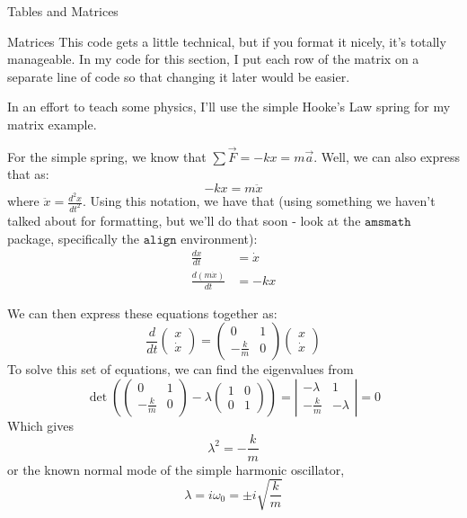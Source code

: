 \documentclass[onecolumn]{article}
\begin{document}
\begin{section}{Tables and Matrices}
	\begin{subsection}{Matrices}
		This code gets a little technical, but if you format it nicely, it's totally manageable. In my code for this section, I put each row of the matrix on a separate line
		of code so that changing it later would be easier.

		In an effort to teach some physics, I'll use the simple Hooke's Law spring for my matrix example.

		For the simple spring, we know that $\sum{\vec{F}}=-kx=m\vec{a}$. Well, we can also express that as:
		$$-kx=m\ddot{x}$$ where \(\ddot{x}=\frac{d^2x}{dt^2}\). Using this notation, we have that (using something we haven't
		talked about for formatting, but we'll do that soon - look at the $\texttt{amsmath}$ package, specifically the $\texttt{align}$ environment):
		\begin{align}
			\frac{dx}{dt}&=\dot{x}	\\
			\frac{d(m\dot{x})}{dt}&=-kx
		\end{align}
		
		We can then express these equations together as:
		\begin{equation}
			\frac{d}{dt}
			\left(\begin{array}{c}
				x \\
				\dot{x} 
			\end{array}\right) = 
			\left(\begin{array}{cc}
				0 & 1 \\
				-\frac{k}{m} & 0
			\end{array}\right)\left(\begin{array}{c}
				x \\
				\dot{x}
			\end{array}\right)
		\end{equation}
		To solve this set of equations, we can find the eigenvalues from
		\begin{equation}
			\det\left(\left(\begin{array}{cc}
				0 & 1 \\
				-\frac{k}{m} & 0
			\end{array}\right) -\lambda\left(\begin{array}{cc}
				1 & 0 \\
				0 & 1
			\end{array}\right)\right)=\left|\begin{array}{cc}
				-\lambda & 1 \\
				-\frac{k}{m} & -\lambda
			\end{array}\right|=0
		\end{equation}
		Which gives
		$$\lambda^2=-\frac{k}{m}$$ or the known normal mode of the simple harmonic oscillator,
		\[\lambda=i\omega_0=\pm{i}\sqrt{\frac{k}{m}}\]


\end{subsection}
\end{section}
\end{document}
